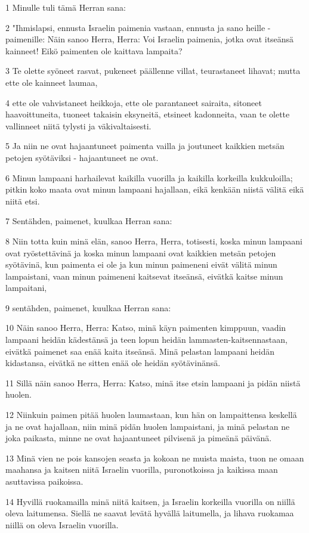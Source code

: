 \par 1 Minulle tuli tämä Herran sana:
\par 2 "Ihmislapsi, ennusta Israelin paimenia vastaan, ennusta ja sano heille - paimenille: Näin sanoo Herra, Herra: Voi Israelin paimenia, jotka ovat itseänsä kainneet! Eikö paimenten ole kaittava lampaita?
\par 3 Te olette syöneet rasvat, pukeneet päällenne villat, teurastaneet lihavat; mutta ette ole kainneet laumaa,
\par 4 ette ole vahvistaneet heikkoja, ette ole parantaneet sairaita, sitoneet haavoittuneita, tuoneet takaisin eksyneitä, etsineet kadonneita, vaan te olette vallinneet niitä tylysti ja väkivaltaisesti.
\par 5 Ja niin ne ovat hajaantuneet paimenta vailla ja joutuneet kaikkien metsän petojen syötäviksi - hajaantuneet ne ovat.
\par 6 Minun lampaani harhailevat kaikilla vuorilla ja kaikilla korkeilla kukkuloilla; pitkin koko maata ovat minun lampaani hajallaan, eikä kenkään niistä välitä eikä niitä etsi.
\par 7 Sentähden, paimenet, kuulkaa Herran sana:
\par 8 Niin totta kuin minä elän, sanoo Herra, Herra, totisesti, koska minun lampaani ovat ryöstettävinä ja koska minun lampaani ovat kaikkien metsän petojen syötävinä, kun paimenta ei ole ja kun minun paimeneni eivät välitä minun lampaistani, vaan minun paimeneni kaitsevat itseänsä, eivätkä kaitse minun lampaitani,
\par 9 sentähden, paimenet, kuulkaa Herran sana:
\par 10 Näin sanoo Herra, Herra: Katso, minä käyn paimenten kimppuun, vaadin lampaani heidän kädestänsä ja teen lopun heidän lammasten-kaitsennastaan, eivätkä paimenet saa enää kaita itseänsä. Minä pelastan lampaani heidän kidastansa, eivätkä ne sitten enää ole heidän syötävinänsä.
\par 11 Sillä näin sanoo Herra, Herra: Katso, minä itse etsin lampaani ja pidän niistä huolen.
\par 12 Niinkuin paimen pitää huolen laumastaan, kun hän on lampaittensa keskellä ja ne ovat hajallaan, niin minä pidän huolen lampaistani, ja minä pelastan ne joka paikasta, minne ne ovat hajaantuneet pilvisenä ja pimeänä päivänä.
\par 13 Minä vien ne pois kansojen seasta ja kokoan ne muista maista, tuon ne omaan maahansa ja kaitsen niitä Israelin vuorilla, puronotkoissa ja kaikissa maan asuttavissa paikoissa.
\par 14 Hyvillä ruokamailla minä niitä kaitsen, ja Israelin korkeilla vuorilla on niillä oleva laitumensa. Siellä ne saavat levätä hyvällä laitumella, ja lihava ruokamaa niillä on oleva Israelin vuorilla.
